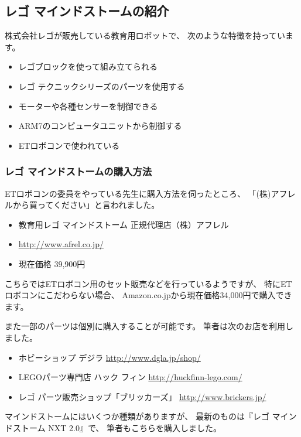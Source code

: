 \documentclass[mingoth,a4paper]{jsarticle}
\begin{document}
\subsection{レゴ マインドストームの紹介}

株式会社レゴが販売している教育用ロボットで、
次のような特徴を持っています。

\begin{itemize}
\item レゴブロックを使って組み立てられる
\item レゴ テクニックシリーズのパーツを使用する
\item モーターや各種センサーを制御できる
\item ARM7のコンピュータユニットから制御する
\item ETロボコンで使われている
\end{itemize}

\subsubsection{レゴ マインドストームの購入方法}
ETロボコンの委員をやっている先生に購入方法を伺ったところ、
「(株)アフレルから買ってください」と言われました。

\begin{itemize}
\item 教育用レゴ マインドストーム 正規代理店（株）アフレル
\item \url{http://www.afrel.co.jp/}
\item 現在価格 39,900円
\end{itemize}

こちらではETロボコン用のセット販売などを行っているようですが、
特にETロボコンにこだわらない場合、
Amazon.co.jpから現在価格34,000円で購入できます。

また一部のパーツは個別に購入することが可能です。
筆者は次のお店を利用しました。

\begin{itemize}
\item ホビーショップ デジラ \url{http://www.dgla.jp/shop/}
\item LEGOパーツ専門店 ハック フィン \url{http://huckfinn-lego.com/}
\item レゴ パーツ販売ショップ「ブリッカーズ」 \url{http://www.brickers.jp/}
\end{itemize}

マインドストームにはいくつか種類がありますが、
最新のものは『レゴ マインドストーム NXT 2.0』で、
筆者もこちらを購入しました。
\end{document}
